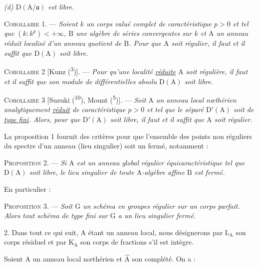 \textit{(d) $\mathrm D(\mathrm A/\mathfrak a)$ est libre.}

\textsc{Corollaire 1.} --- \textit{Soient $k$ un corps valué complet de caractéristique $p>0$ et tel que $(k:k^{p})<+\infty$, $\mathrm B$ une algèbre de séries convergentes sur $k$ et $\mathrm A$ un anneau réduit localisé d’un anneau quotient de $\mathrm B$. Pour que $\mathrm A$ soit régulier, il faut et il suffit que $\mathrm D(\mathrm A)$ soit libre.}

\textsc{Corollaire 2} [Kunz (\textsuperscript{3})]. --- \textit{Pour qu’une localité \uline{réduite} $\mathrm A$ soit régulière, il faut et il suffit que son module de différentielles absolu $\mathrm D(\mathrm A)$ soit libre.}

\textsc{Corollaire 3} [Suzuki (\textsuperscript{10}), Mount (\textsuperscript{5})]. --- \textit{Soit $\mathrm A$ un anneau local nœthérien analytiquement \uline{réduit} de caractéristique $p>0$ et tel que le séparé $\mathrm D'(\mathrm A)$ soit de \uline{type fini}. Alors, pour que $\mathrm D'(\mathrm A)$ soit libre, il faut et il suffit que $\mathrm A$ soit régulier.}

La proposition 1 fournit des critères pour que l’ensemble des points non réguliers du spectre d’un anneau (lieu singulier) soit un fermé, notamment :

\margin{\handwritten{$\left.\rule{0pt}{2em}\right]$}}\textsc{Proposition 2.} --- \textit{Si $\mathrm A$ est un anneau global régulier équicaractéristique tel que $\mathrm D(\mathrm A)$ soit libre, le lieu singulier de toute $\mathrm A$-algèbre affine $\mathrm B$ est fermé.}

En particulier :

\textsc{Proposition 3.} --- \textit{Soit $\mathrm G$ un schéma en groupes régulier sur un corps parfait. Alors tout schéma de type fini sur $\mathrm G$ a un lieu singulier fermé.}

2. Dans tout ce qui suit, $\mathrm A$ étant un anneau local, nous désignerons par $\mathrm L_{\mathrm A}$ son corps résiduel et par $\mathrm K_{\mathrm A}$ son corps de fractions s’il est intègre.

Soient $\mathrm A$ un anneau local nœthérien et $\widehat{\mathrm A}$ son complété. On a :

